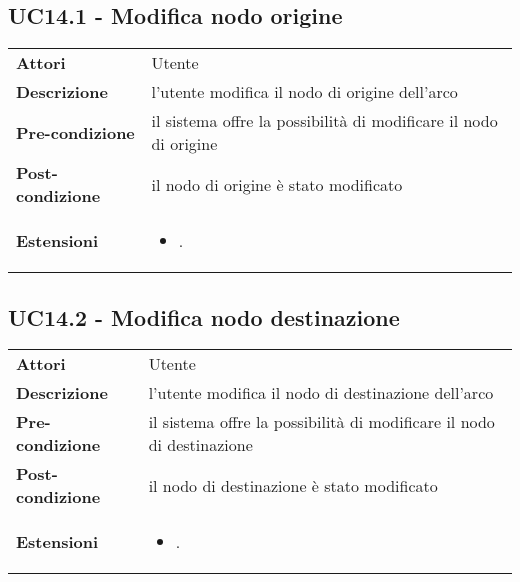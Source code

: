 \subsection{UC14.1 - Modifica nodo origine}
\label{sssec:UC14.1}
\def\arraystretch{1.5}
\begin{tabularx}{\textwidth}{l|p{}}
\rowcolor{I} \multicolumn{2}{c}{\color{white}\textbf{UC14.1 - Modifica nodo origine}} \\
\toprule
\endhead
\textbf{Attori} & Utente\\
\textbf{Descrizione} & l'utente modifica il nodo di origine dell'arco\\
\textbf{Pre-condizione} & il sistema offre la possibilità di modificare il nodo di origine\\
\textbf{Post-condizione} & il nodo di origine è stato modificato\\
\textbf{Estensioni} & \vspace{-1.2em}\begin{itemize}[leftmargin=*,noitemsep,nosep]
\item \nameref{sssec:UC14.3}.
\end{itemize}\\
\bottomrule
\end{tabularx}
\subsection{UC14.2 - Modifica nodo destinazione}
\label{sssec:UC14.2}
\def\arraystretch{1.5}
\begin{tabularx}{\textwidth}{l|p{}}
\rowcolor{I} \multicolumn{2}{c}{\color{white}\textbf{UC14.2 - Modifica nodo destinazione}} \\
\toprule
\endhead
\textbf{Attori} & Utente\\
\textbf{Descrizione} & l'utente modifica il nodo di destinazione dell'arco\\
\textbf{Pre-condizione} & il sistema offre la possibilità di modificare il nodo di destinazione\\
\textbf{Post-condizione} & il nodo di destinazione è stato modificato\\
\textbf{Estensioni} & \vspace{-1.2em}\begin{itemize}[leftmargin=*,noitemsep,nosep]
\item \nameref{sssec:UC14.3}.
\end{itemize}\\
\bottomrule
\end{tabularx}
